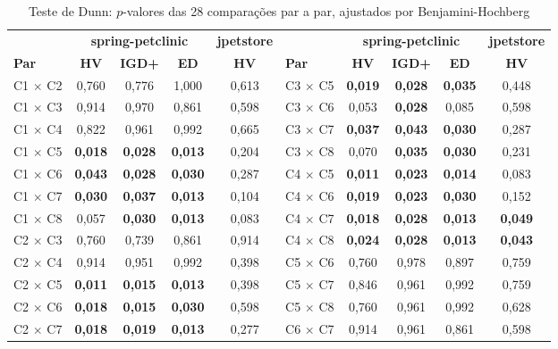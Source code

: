 \documentclass[conference]{IEEEtran}
\begin{document}
\begin{table}[t]
\caption{Teste de Dunn: $p$-valores das 28 comparações par a par, ajustados por Benjamini-Hochberg}
\label{tab:dunn}
\centering
\footnotesize
\begin{tabular}{l|ccc|c||l|ccc|c}
\hline
 & \multicolumn{3}{c|}{\textbf{spring-petclinic}} & \textbf{jpetstore} & & \multicolumn{3}{c|}{\textbf{spring-petclinic}} & \textbf{jpetstore} \\
\textbf{Par} & \textbf{HV} & \textbf{IGD+} & \textbf{ED} & \textbf{HV} & \textbf{Par} & \textbf{HV} & \textbf{IGD+} & \textbf{ED} & \textbf{HV} \\
\hline
C1 $\times$ C2 & 0,760 & 0,776 & 1,000 & 0,613 & C3 $\times$ C5 & \textbf{0,019} & \textbf{0,028} & \textbf{0,035} & 0,448 \\
C1 $\times$ C3 & 0,914 & 0,970 & 0,861 & 0,598 & C3 $\times$ C6 & 0,053 & \textbf{0,028} & 0,085 & 0,598 \\
C1 $\times$ C4 & 0,822 & 0,961 & 0,992 & 0,665 & C3 $\times$ C7 & \textbf{0,037} & \textbf{0,043} & \textbf{0,030} & 0,287 \\
C1 $\times$ C5 & \textbf{0,018} & \textbf{0,028} & \textbf{0,013} & 0,204 & C3 $\times$ C8 & 0,070 & \textbf{0,035} & \textbf{0,030} & 0,231 \\
C1 $\times$ C6 & \textbf{0,043} & \textbf{0,028} & \textbf{0,030} & 0,287 & C4 $\times$ C5 & \textbf{0,011} & \textbf{0,023} & \textbf{0,014} & 0,083 \\
C1 $\times$ C7 & \textbf{0,030} & \textbf{0,037} & \textbf{0,013} & 0,104 & C4 $\times$ C6 & \textbf{0,019} & \textbf{0,023} & \textbf{0,030} & 0,152 \\
C1 $\times$ C8 & 0,057 & \textbf{0,030} & \textbf{0,013} & 0,083 & C4 $\times$ C7 & \textbf{0,018} & \textbf{0,028} & \textbf{0,013} & \textbf{0,049} \\
C2 $\times$ C3 & 0,760 & 0,739 & 0,861 & 0,914 & C4 $\times$ C8 & \textbf{0,024} & \textbf{0,028} & \textbf{0,013} & \textbf{0,043} \\
C2 $\times$ C4 & 0,914 & 0,951 & 0,992 & 0,398 & C5 $\times$ C6 & 0,760 & 0,978 & 0,897 & 0,759 \\
C2 $\times$ C5 & \textbf{0,011} & \textbf{0,015} & \textbf{0,013} & 0,398 & C5 $\times$ C7 & 0,846 & 0,961 & 0,992 & 0,759 \\
C2 $\times$ C6 & \textbf{0,018} & \textbf{0,015} & \textbf{0,030} & 0,598 & C5 $\times$ C8 & 0,760 & 0,961 & 0,992 & 0,628 \\
C2 $\times$ C7 & \textbf{0,018} & \textbf{0,019} & \textbf{0,013} & 0,277 & C6 $\times$ C7 & 0,914 & 0,961 & 0,861 & 0,598 \\

\end{tabular}
\end{table}
\end{document}
